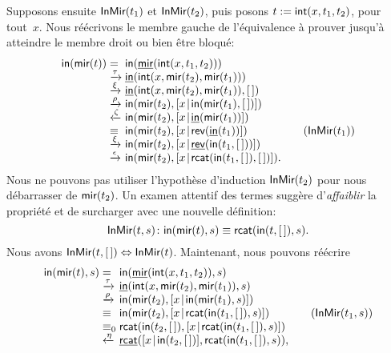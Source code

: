 Supposons ensuite \(\textsf{InMir}({t_1})\) et \(\textsf{InMir}({t_2})\), puis
posons \(t := \textsf{int}(x,t_1,t_2)\), pour tout~\(x\). Nous réécrivons
le membre gauche de l'équivalence à prouver jusqu'à atteindre le
membre droit ou bien être bloqué:
\begin{equation*}
\begin{array}{@{}r@{\;}l@{\;}l@{\qquad}r@{}}
\fun{in}(\fun{mir}(t)) & = &
\fun{in}(\ufun{mir}(\fun{int}(x,t_1,t_2)))\\
& \xrightarrow{\smash{\tau}}
& \ufun{in}(\fun{int}(x,\fun{mir}(t_2),\fun{mir}(t_1)))\\
& \xrightarrow{\smash{\xi}}
& \ufun{in}(\fun{int}(x,\fun{mir}(t_2),\fun{mir}(t_1)),\el)\\
& \xrightarrow{\smash{\rho}}
& \fun{in}(\fun{mir}(t_2),\cons{x}{\fun{in}(\fun{mir}(t_1),\el)})\\
& \xleftarrow{\smash{\zeta}}
& \fun{in}(\fun{mir}(t_2),\cons{x}{\ufun{in}(\fun{mir}(t_1))})\\
& \equiv
& \fun{in}(\fun{mir}(t_2),\cons{x}{\fun{rev}(\ufun{in}(t_1))})
& (\pred{InMir}{t_1})\\
& \xrightarrow{\smash{\xi}}
& \fun{in}(\fun{mir}(t_2),\cons{x}{\ufun{rev}(\fun{in}(t_1,\el))})\\
& \xrightarrow{\smash{\epsilon}}
& \fun{in}(\fun{mir}(t_2),\cons{x}{\fun{rcat}(\fun{in}(t_1,\el),\el)}).
\end{array}
\end{equation*}
Nous ne pouvons pas utiliser l'hypothèse d'induction
\(\textsf{InMir}({t_2})\) pour nous débarrasser de \(\textsf{mir}(t_2)\). Un
examen attentif des termes suggère d'\emph{affaiblir} la propriété et
de surcharger  avec une nouvelle définition:
\begin{equation*}
\textsf{InMir}({t,s}) \colon \textsf{in}(\textsf{mir}(t),s) \equiv
\textsf{rcat}(\textsf{in}(t,[\,]),s).
\end{equation*}
Nous avons \(\textsf{InMir}({t,[\,]}) \Leftrightarrow
\textsf{InMir}({t})\). Maintenant, nous pouvons réécrire
\begin{equation*}
\begin{array}{@{}r@{\;}l@{\;}l@{\qquad}r@{}}
\fun{in}(\fun{mir}(t),s)
& =
& \fun{in}(\ufun{mir}(\fun{int}(x,t_1,t_2)),s)\\
& \xrightarrow{\smash{\tau}}
& \ufun{in}(\fun{int}(x,\fun{mir}(t_2),\fun{mir}(t_1)),s)\\
& \xrightarrow{\smash{\rho}}
& \fun{in}(\fun{mir}(t_2),\cons{x}{\fun{in}(\fun{mir}(t_1),s)})\\
& \equiv
& \fun{in}(\fun{mir}(t_2),\cons{x}{\fun{rcat}(\fun{in}(t_1,\el),s)})
& (\pred{InMir}{t_1,s})\\
& \equiv_0
& \fun{rcat}(\fun{in}(t_2,\el),\cons{x}{\fun{rcat}(\fun{in}(t_1,\el),s)})\\
& \xleftarrow{\smash{\eta}}
& \ufun{rcat}(\cons{x}{\fun{in}(t_2,\el)},\fun{rcat}(\fun{in}(t_1,\el),s)),
\end{array}
\end{equation*}

